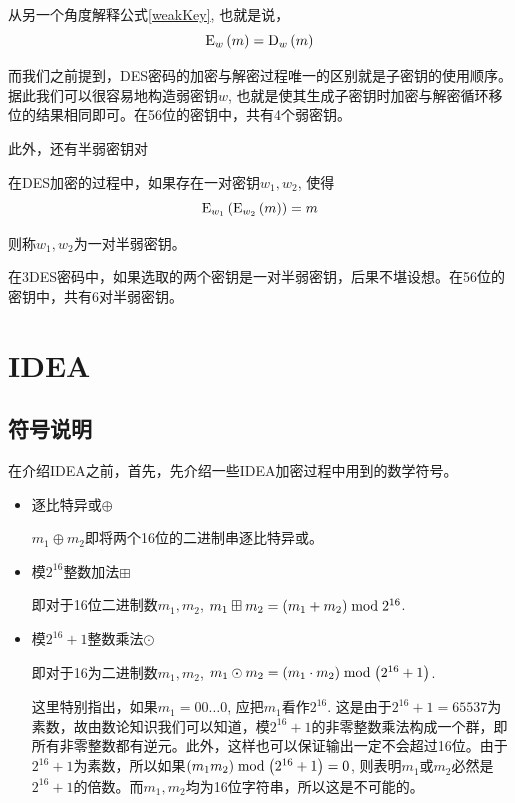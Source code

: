 从另一个角度解释公式\ref{weakKey}, 也就是说，
\begin{equation}
\mathrm{E}_w\left( {m}\right)=\mathrm{D}_w\left( {m}\right)
\end{equation}

而我们之前提到，DES密码的加密与解密过程唯一的区别就是子密钥的使用顺序。据此我们可以很容易地构造弱密钥$w$, 也就是使其生成子密钥时加密与解密循环移位的结果相同即可。在56位的密钥中，共有4个弱密钥。\par
此外，还有半弱密钥对
\begin{Definition}
在DES加密的过程中，如果存在一对密钥$w_1, w_2$, 使得
\begin{equation}
\mathrm{E}_{w_1}\left( {\mathrm{E}_{w_2}\left( {m}\right)}\right)=m
\end{equation}

则称$w_1, w_2$为一对半弱密钥。
\end{Definition}

在3DES密码中，如果选取的两个密钥是一对半弱密钥，后果不堪设想。在56位的密钥中，共有6对半弱密钥。
\section{IDEA}
\subsection{符号说明}
在介绍IDEA之前，首先，先介绍一些IDEA加密过程中用到的数学符号。
\begin{itemize}
\item 逐比特异或$\oplus$\par
$m_1\oplus m_2$即将两个16位的二进制串逐比特异或。
\item 模$2^{16}$整数加法$\boxplus$\par
即对于16位二进制数$m_1, m_2$, $m_1\boxplus m_2=\left( {m_1+m_2}\right)\bmod{2^{16}}$.
\item 模$2^{16}+1$整数乘法$\odot$\par
即对于16为二进制数$m_1, m_2$, $m_1\odot m_2=\left( {m_1\cdot m_2}\right)\bmod{\left( {2^{16}+1}\right)}$.\par
这里特别指出，如果$m_1=00\ldots 0$, 应把$m_1$看作$2^{16}$. 这是由于$2^{16}+1=65537$为素数，故由数论知识我们可以知道，模$2^{16}+1$的非零整数乘法构成一个群，即所有非零整数都有逆元。此外，这样也可以保证输出一定不会超过16位。由于$2^{16}+1$为素数，所以如果$\left( {m_1m_2}\right)\bmod{\left( {2^{16}+1}\right)}=0$, 则表明$m_1$或$m_2$必然是$2^{16}+1$的倍数。而$m_1, m_2$均为16位字符串，所以这是不可能的。
\end{itemize}
